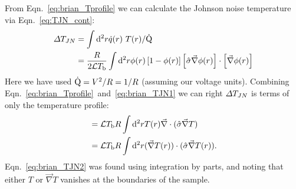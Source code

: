 From Eqn.~\ref{eq:brian_Tprofile} we can calculate the Johnson noise temperature via Eqn.~\ref{eq:TJN_cont}:
\begin{align}
\Delta T_{JN} &= \int\mathrm{d}^2r\dot{q}(r)~T(r) / \dot{\mathrm{Q}} \nonumber \\
&= \frac{R}{2\mathcal{L} T_\mathrm{b}}\int\mathrm{d}^2r\phi(r)\left[1-\phi(r)\right]\left[\hat\sigma\vec\nabla\phi(r)\right]\cdot\left[\vec\nabla\phi(r)\right]\label{eq:brian_TJN1}
\end{align}
Here we have used $\dot{\mathrm{Q}} = V^2/R = 1/R$ (assuming our voltage units). Combining Eqn.~\ref{eq:brian_Tprofile}~and~\ref{eq:brian_TJN1} we can right $\Delta T_{JN}$ is terms of only the temperature profile:
\begin{align}
&= \mathcal{L} T_\mathrm{b}R\int\mathrm{d}^2rT(r)\vec\nabla\cdot(\hat\sigma\vec\nabla T) \nonumber \\
&= \mathcal{L} T_\mathrm{b}R\int\mathrm{d}^2r(\vec\nabla T(r))\cdot(\hat\sigma\vec\nabla T(r)).\label{eq:brian_TJN2}
\end{align}
Eqn.~\ref{eq:brian_TJN2} was found using integration by parts, and noting that either $T$ or $\vec\nabla T$ vanishes at the boundaries of the sample.

